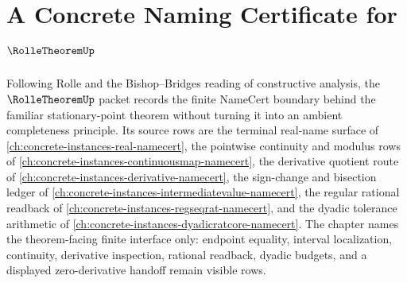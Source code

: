 \chapter{A Concrete Naming Certificate for $\RolleTheoremUp$}
\label{ch:concrete-instances-rolle-theorem-namecert}

Following Rolle and the Bishop--Bridges reading of constructive analysis, the $\RolleTheoremUp$ packet records the finite NameCert boundary behind the familiar stationary-point theorem without turning it into an ambient completeness principle. Its source rows are the terminal real-name surface of \autoref{ch:concrete-instances-real-namecert}, the pointwise continuity and modulus rows of \autoref{ch:concrete-instances-continuousmap-namecert}, the derivative quotient route of \autoref{ch:concrete-instances-derivative-namecert}, the sign-change and bisection ledger of \autoref{ch:concrete-instances-intermediatevalue-namecert}, the regular rational readback of \autoref{ch:concrete-instances-regseqrat-namecert}, and the dyadic tolerance arithmetic of \autoref{ch:concrete-instances-dyadicratcore-namecert}. The chapter names the theorem-facing finite interface only: endpoint equality, interval localization, continuity, derivative inspection, rational readback, dyadic budgets, and a displayed zero-derivative handoff remain visible rows.

